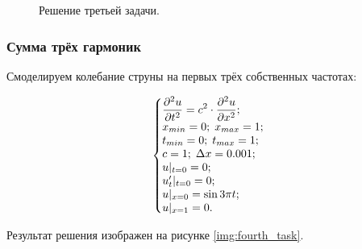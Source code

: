 \documentclass[12pt,a4paper,russian]{report}
\begin{document}
	\begin{figure}[h]
		\caption{Решение третьей задачи.}
		\label{img:third_task}
	\end{figure}
	
	\newpage
	\subsubsection{Сумма трёх гармоник}
	
	Смоделируем колебание струны на первых трёх собственных частотах:
	
	\begin{equation*}
		\left\{\begin{array}{@{}l@{}}
			\displaystyle \frac{\partial^2u}{\partial t^2} = c^2 \cdot \frac{\partial^2u}{\partial x^2}; \\
			x_{min} = 0; \; x_{max} = 1; \\
			t_{min} = 0; \; t_{max} = 1; \\
			c = 1; \;  \Delta x = 0.001; \\
			u|_{t=0} = 0; \\
			u'_{t}|_{t=0} = 0; \\
			u|_{x=0} = \sin 3 \pi t; \\
			u|_{x=1} = 0.
		\end{array}\right.\,
	\end{equation*}
	
	Результат решения изображен на рисунке \ref{img:fourth_task}.
	
\end{document}
